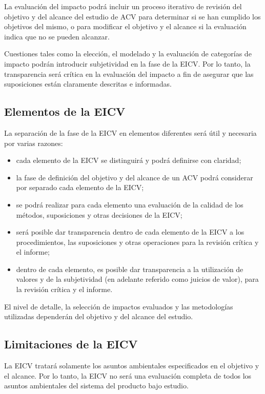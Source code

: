 La evaluación del impacto podrá incluir un proceso iterativo de revisión del objetivo y del alcance del estudio de ACV para determinar si se han cumplido los objetivos del mismo, o para modificar el objetivo y el alcance si la evaluación indica que no se pueden alcanzar.

Cuestiones tales como la elección, el modelado y la evaluación de categorías de impacto podrán introducir subjetividad en la fase de la EICV. Por lo tanto, la transparencia será crítica en la evaluación del impacto a fin de asegurar que las suposiciones están claramente descritas e informadas.


\subsection{Elementos de la EICV}
La separación de la fase de la EICV en elementos diferentes será útil y necesaria por varias razones:
\begin{itemize}
  \item cada elemento de la EICV se distinguirá y podrá definirse con claridad;
  \item la fase de definición del objetivo y del alcance de un ACV podrá considerar por separado cada elemento de la EICV;
  \item se podrá realizar para cada elemento una evaluación de la calidad de los métodos, suposiciones y otras decisiones de la EICV;
  \item será posible dar transparencia dentro de cada elemento de la EICV a los procedimientos, las suposiciones y otras operaciones para la revisión crítica y el informe;
  \item dentro de cada elemento, es posible dar transparencia a la utilización de valores y de la subjetividad (en adelante referido como juicios de valor), para la revisión crítica y el informe.
\end{itemize}

El nivel de detalle, la selección de impactos evaluados y las metodologías utilizadas dependerán del objetivo y del alcance del estudio.

\subsection{Limitaciones de la EICV}
La EICV tratará solamente los asuntos ambientales especificados en el objetivo y el alcance. Por lo tanto, la EICV no será una evaluación completa de todos los asuntos ambientales del sistema del producto bajo estudio.

